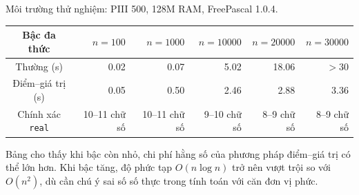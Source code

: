 \documentclass[11pt]{article}
\begin{document}
Môi trường thử nghiệm: PIII 500, 128M RAM, FreePascal 1.0.4.

\begin{center}
\small
\setlength{\tabcolsep}{4pt}
\begin{tabular}{c|rrrrr}
Bậc đa thức & \(n=100\) & \(n=1000\) & \(n=10000\) & \(n=20000\) & \(n=30000\)\\ \hline
Thường (s) & 0.02 & 0.07 & 5.02 & 18.06 & \(>30\)\\
Điểm--giá trị (s) & 0.05 & 0.50 & 2.46 & 2.88 & 3.36\\
Chính xác \texttt{real} & 10--11 chữ số & 10--11 chữ số & 9--10 chữ số & 8--9 chữ số & 8--9 chữ số
\end{tabular}
\end{center}

Bảng cho thấy khi bậc còn nhỏ, chi phí hằng số của phương pháp điểm--giá trị
có thể lớn hơn. Khi bậc tăng, độ phức tạp \(O(n\log n)\) trở nên vượt trội
so với \(O(n^2)\), dù cần chú ý sai số số thực trong tính toán với căn đơn
vị phức.
\end{document}
